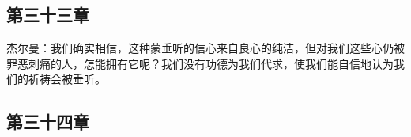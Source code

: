 
\subsection{第三十三章}

\par

杰尔曼：我们确实相信，这种蒙垂听的信心来自良心的纯洁，但对我们这些心仍被罪恶刺痛的人，怎能拥有它呢？我们没有功德为我们代求，使我们能自信地认为我们的祈祷会被垂听。\par


\subsection{第三十四章}

\par

